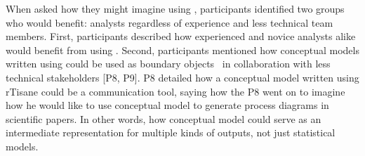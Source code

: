 When asked how they might imagine using \rTisane, participants identified two
groups who would benefit: analysts regardless of experience and less technical
team members. First, participants described how experienced and novice analysts
alike would benefit from using \rTisane [P2, P4, P9, P10, P12]. Second,
participants mentioned how conceptual models written using \rTisane could be
used as boundary objects~\cite{star1989boundaryObjects} in collaboration with less technical
stakeholders [P8, P9]. P8 detailed how a conceptual model written using rTisane
could be a communication tool, saying how the  P8 went on to imagine how he would like to
use \rTisanes conceptual model to generate process diagrams in scientific
papers. In other words, how \rTisanes conceptual model could serve as an
intermediate representation for multiple kinds of outputs, not just statistical
models. 


\begin{comment}
\theme{Analysts want to use \rTisane iteratively.}
Participants described their typical analysis approach without rTisane as
iterative. During the study, this looked like visualizing the data [P6, 10,
11, 12], assessing correlations between variables [P6, P10] to pick variables
for an initial statistical model, or starting with ``a full model first and
then trim down and compare'' [P11]. In the scaffold condition, analysts engaged
with the connection between their conceptual and statistical models [P2, 5,
12]. For example, P5 refined her conceptual model prior to implementing a
statistical model: ``Conceptual model matters because it gives something to
start with...how all of them have impacts...after have done analysis, look at
R-sq and p-value to interpret significance of these predictors.'' P5 also
grappled with how to interpret the statistical modeling results in light of her
conceptual model, especially since she PICK Background or Prediction as reason.
viewed the purpose of analysis to be able to predict income: ``Really don’t see
how statistical analysis helps us with why…'' She also explained how even though
she had a conceptual model, she did not feel she had the appropriate
background:``[if she had] more of a social science...background knowledge that
we have to dig deeper.'' While P5 could have interpreted her statistical models
in light of the conceptual model she authored, her observation about background
is nevertheless indicative of….
\end{comment}



